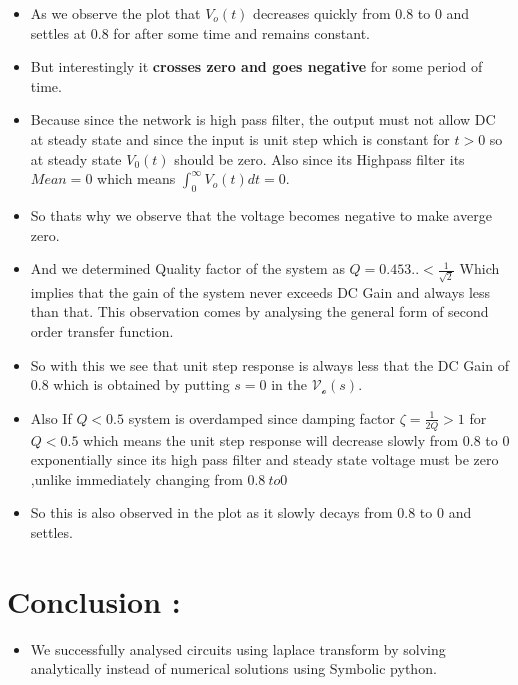 \documentclass[10pt,a4paper]{article}
\providecommand{\tightlist}{%
      \setlength{\itemsep}{0pt}\setlength{\parskip}{0pt}}
\begin{document}
\begin{itemize}
\item
  As we observe the plot that \(V_{o}(t)\) decreases quickly from 0.8 to
  0 and settles at 0.8 for after some time and remains constant.
\item
  But interestingly it \textbf{crosses zero and goes negative} for some
  period of time.
\item
  Because since the network is high pass filter, the output must not
  allow DC at steady state and since the input is unit step which is
  constant for \(t>0\) so at steady state \(V_{0}(t)\) should be zero.
  Also since its Highpass filter its \(Mean = 0\) which means
  \(\int_{0}^{\infty} V_{o}(t) dt = 0\).
\item
  So thats why we observe that the voltage becomes negative to make
  averge zero.
\item
  And we determined Quality factor of the system as
  \(Q = 0.453.. < \frac{1}{\sqrt{2}}\) Which implies that the gain of
  the system never exceeds DC Gain and always less than that. This
  observation comes by analysing the general form of second order
  transfer function.
\item
  So with this we see that unit step response is always less that the DC
  Gain of \(0.8\) which is obtained by putting \(s=0\) in the
  \(\mathcal{V_{o}}(s)\).
\item
  Also If \(Q < 0.5\) system is overdamped since damping factor
  \(\zeta = \frac{1}{2Q} > 1\) for \(Q<0.5\) which means the unit step
  response will decrease slowly from 0.8 to \(0\) exponentially since
  its high pass filter and steady state voltage must be zero ,unlike
  immediately changing from \(0.8 \ to 0\)
\item
  So this is also observed in the plot as it slowly decays from 0.8 to 0
  and settles.
\end{itemize}

    \section{Conclusion :}\label{conclusion}

    \begin{itemize}
\tightlist
\item
  We successfully analysed circuits using laplace transform by solving
  analytically instead of numerical solutions using Symbolic python.
\end{itemize}


    
    
    
    
\end{document}
